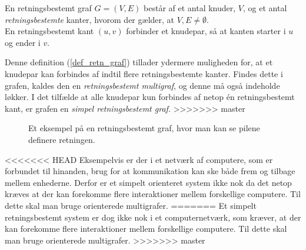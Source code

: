 \begin{defn}
\begin{defn}
En retningsbestemt graf $G = (V, E)$ består af et antal knuder, $V$, og et antal \textit{retningsbestemte} kanter, hvorom der gælder, at $V, E \neq \emptyset$.\\
En retningsbestemt kant $(u,v)$ forbinder et knudepar, så at kanten starter i $u$ og ender i $v$.
\label{def_retn_graf}
\end{defn} 

\noindent Denne definition (\ref{def_retn_graf}) tillader ydermere muligheden for, at et knudepar kan forbindes af indtil flere retningsbestemte kanter. Findes dette i grafen, kaldes den en \textit{retningsbestemt multigraf}, og denne må også indeholde løkker. I det tilfælde at alle knudepar kun forbindes af netop én retningsbestemt kant, er grafen en \textit{simpel retningsbestemt graf}.
>>>>>>> master

\begin{figure}[h]
\centering
\caption{Et eksempel på en retningsbestemt graf, hvor man kan se pilene definere retningen.}
\end{figure}

<<<<<<< HEAD
\noindent Eksempelvis er der i et netværk af computere, som er forbundet til hinanden, brug for at kommunikation kan ske både frem og tilbage mellem enhederne. Derfor er et simpelt orienteret system ikke nok da det netop kræves at der kan forekomme flere interaktioner mellem forskellige computere. Til dette skal man bruge orienterede multigrafer.
=======
\noindent Et simpelt retningsbestemt system er dog ikke nok i et computernetværk, som kræver, at der kan forekomme flere interaktioner mellem forskellige computere. Til dette skal man bruge orienterede multigrafer.
>>>>>>> master

\begin{figure}[h]
\centering
{}
\end{figure}
\end{defn}
